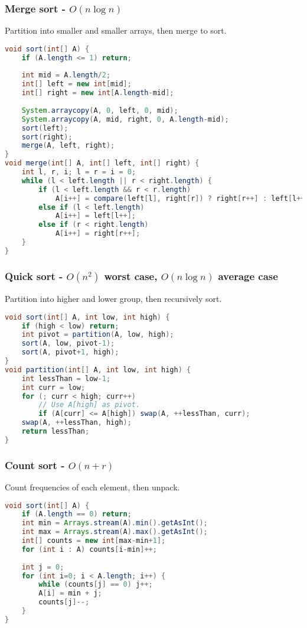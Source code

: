 \documentclass[10pt]{article}
\begin{document}
\begin{comment}
\subsubsection{Bubble sort}
Not very good or interesting...
\end{comment}

\subsubsection{Merge sort - $O(n\log n)$}
Partition into smaller and smaller arrays, then merge to sort.
\begin{lstlisting}[language=java]
void sort(int[] A) {
    if (A.length <= 1) return;
    
    int mid = A.length/2;
    int[] left = new int[mid];
    int[] right = new int[A.length-mid];
    
    System.arraycopy(A, 0, left, 0, mid);
    System.arraycopy(A, mid, right, 0, A.length-mid);
    sort(left);
    sort(right);
    merge(A, left, right);
}
void merge(int[] A, int[] left, int[] right) {
    int l, r, i; l = r = i = 0;
    while (l < left.length || r < right.length) {
        if (l < left.length && r < r.length)
            A[i++] = compare(left[l], right[r]) ? right[r++] : left[l++];
        else if (l < left.length)
            A[i++] = left[l++];
        else if (r < right.length)
            A[i++] = right[r++];
    }    
}
\end{lstlisting}

\subsubsection{Quick sort - $O(n^2)$ worst case, $O(n\log n)$ average case}
Partition into higher and lower group, then recursively sort.
\begin{lstlisting}[language=java]
void sort(int[] A, int low, int high) {
    if (high < low) return;
    int pivot = partition(A, low, high);
    sort(A, low, pivot-1);
    sort(A, pivot+1, high);
}
void partition(int[] A, int low, int high) {
    int lessThan = low-1;
    int curr = low;
    for (; curr < high; curr++)
        // Use A[high] as pivot.
        if (A[curr] <= A[high]) swap(A, ++lessThan, curr);
    swap(A, ++lessThan, high);
    return lessThan;
}
\end{lstlisting}

\subsubsection{Count sort - $O(n+r)$}
Count frequencies of each element, then unpack.
\begin{lstlisting}[language=java]
void sort(int[] A) {
    if (A.length == 0) return;
    int min = Arrays.stream(A).min().getAsInt();
    int max = Arrays.stream(A).max().getAsInt();
    int[] counts = new int[max-min+1];
    for (int i : A) counts[i-min]++;
    
    int j = 0;
    for (int i=0; i < A.length; i++) {
        while (counts[j] == 0) j++;
        A[i] = min + j;
        counts[j]--;
    }
}
\end{lstlisting}
\end{document}
